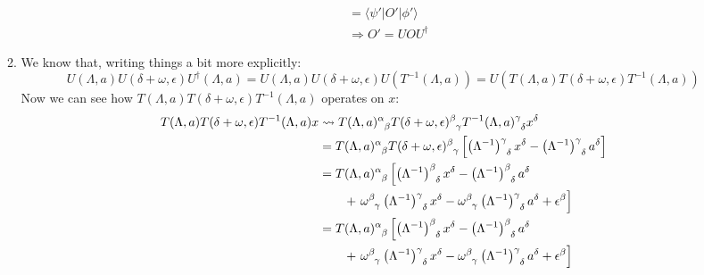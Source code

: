 \documentclass[12pt,a4]{article}
\begin{document}
\begin{enumerate}
\begin{enumerate}
\begin{align*}
                                      &= \langle \psi' | O' | \phi' \rangle\\
                                      &\Rightarrow O' = U O U^\dagger
    \end{align*}
  \item
    We know that, writing things a bit more explicitly:
    \begin{equation*}
      U(\Lambda, a)U(\delta + \omega, \epsilon) U^\dagger(\Lambda, a)= U(\Lambda, a)U(\delta + \omega, \epsilon) U(T^{-1}(\Lambda, a)) = U(T(\Lambda, a)T(\delta + \omega, \epsilon)T^{-1}(\Lambda, a))
    \end{equation*}
    Now we can see how $T(\Lambda, a)T(\delta + \omega, \epsilon)T^{-1}(\Lambda, a)$ operates on $x$:
    \begin{align*}
      T(\Lambda, a)T(\delta + \omega, \epsilon)T^{-1}(\Lambda, a)x &\leadsto \tensor{T(\Lambda, a)}{^\alpha_\beta}\tensor{T(\delta + \omega, \epsilon)}{^\beta_\gamma}\tensor{T^{-1}(\Lambda, a)}{^\gamma_\delta}x^\delta\\
                                                                   &= \tensor{T(\Lambda, a)}{^\alpha_\beta}\tensor{T(\delta + \omega, \epsilon)}{^\beta_\gamma}\left[\tensor{\left(\Lambda^{-1}\right)}{^\gamma_\delta}x^\delta - \tensor{\left(\Lambda^{-1}\right)}{^\gamma_\delta}a^\delta\right]\\
                                                                   &= \tensor{T(\Lambda, a)}{^\alpha_\beta}\left[\tensor{\left(\Lambda^{-1}\right)}{^\beta_\delta}x^\delta - \tensor{\left(\Lambda^{-1}\right)}{^\beta_\delta}a^\delta \right.\\
                                                                   &\qquad + \left.\tensor{\omega}{^\beta_\gamma}\tensor{\left(\Lambda^{-1}\right)}{^\gamma_\delta}x^\delta - \tensor{\omega}{^\beta_\gamma}\tensor{\left(\Lambda^{-1}\right)}{^\gamma_\delta}a^\delta + \epsilon^\beta\right]\\
                                                                   &= \tensor{T(\Lambda, a)}{^\alpha_\beta}\left[\tensor{\left(\Lambda^{-1}\right)}{^\beta_\delta}x^\delta - \tensor{\left(\Lambda^{-1}\right)}{^\beta_\delta}a^\delta \right.\\
                                                                   &\qquad + \left. \tensor{\omega}{^\beta_\gamma}\tensor{\left(\Lambda^{-1}\right)}{^\gamma_\delta}x^\delta - \tensor{\omega}{^\beta_\gamma}\tensor{\left(\Lambda^{-1}\right)}{^\gamma_\delta}a^\delta + \epsilon^\beta\right]\\

\end{align*}
\end{enumerate}
\end{enumerate}
\end{document}
